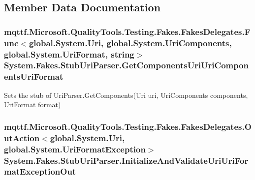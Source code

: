 \subsection{Member Data Documentation}
\hypertarget{class_system_1_1_fakes_1_1_stub_uri_parser_a2e373e35ad12295c72944333c351e2e9}{
\subsubsection[{Get\-Components\-Uri\-Uri\-Components\-Uri\-Format}]{\setlength{\rightskip}{0pt plus 5cm}mqttf.\-Microsoft.\-Quality\-Tools.\-Testing.\-Fakes.\-Fakes\-Delegates.\-Func$<$global.\-System.\-Uri, global.\-System.\-Uri\-Components, global.\-System.\-Uri\-Format, string$>$ System.\-Fakes.\-Stub\-Uri\-Parser.\-Get\-Components\-Uri\-Uri\-Components\-Uri\-Format}}\label{class_system_1_1_fakes_1_1_stub_uri_parser_a2e373e35ad12295c72944333c351e2e9}


Sets the stub of Uri\-Parser.\-Get\-Components(\-Uri uri, Uri\-Components components, Uri\-Format format)

\hypertarget{class_system_1_1_fakes_1_1_stub_uri_parser_ae82e4a858c220347934489fb13ff2fd2}{
\subsubsection[{Initialize\-And\-Validate\-Uri\-Uri\-Format\-Exception\-Out}]{\setlength{\rightskip}{0pt plus 5cm}mqttf.\-Microsoft.\-Quality\-Tools.\-Testing.\-Fakes.\-Fakes\-Delegates.\-Out\-Action$<$global.\-System.\-Uri, global.\-System.\-Uri\-Format\-Exception$>$ System.\-Fakes.\-Stub\-Uri\-Parser.\-Initialize\-And\-Validate\-Uri\-Uri\-Format\-Exception\-Out}}\label{class_system_1_1_fakes_1_1_stub_uri_parser_ae82e4a858c220347934489fb13ff2fd2}


